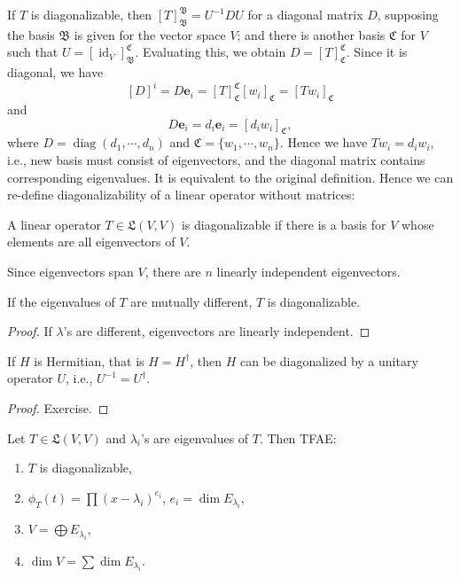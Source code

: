 If $T$ is diagonalizable, then $[T]_{\mathfrak B}^{\mathfrak B} = U^{-1}DU$ for a diagonal matrix $D$, supposing the basis $\mathfrak B$ is given for the vector space $V$; and there is another basis $\mathfrak C$ for $V$ such that $U = [\operatorname{id}_V]_{\mathfrak B}^{\mathfrak C}$. Evaluating this, we obtain $D=[T]_{\mathfrak C}^{\mathfrak C}.$ Since it is diagonal, we have $$[D]^{i} = D\mathbf e_i  = [T]_{\mathfrak C}^{\mathfrak C} [w_i]_{\mathfrak C}=[T w_i]_{\mathfrak C}$$ and $$D\mathbf e_i = d_i\mathbf e_i =[d_i w_i]_{\mathfrak C},$$ where $D=\operatorname{diag}(d_1,\cdots,d_n)$ and $\mathfrak C = \{w_1, \cdots, w_n\}.$ Hence we have $Tw_i = d_i w_i$, i.e., new basis must consist of eigenvectors, and the diagonal matrix contains corresponding eigenvalues. It is equivalent to the original definition. Hence we can re-define diagonalizability of a linear operator without matrices:
\begin{defn} A linear operator $T\in\mathfrak L(V,V)$ is diagonalizable if there is a basis for $V$ whose elements are all eigenvectors of $V$.
\end{defn}
Since eigenvectors span $V$, there are $n$ linearly independent eigenvectors.
\begin{prop}
If the eigenvalues of $T$ are mutually different, $T$ is diagonalizable.
\end{prop}
\begin{proof}
If $\lambda$'s are different, eigenvectors are linearly independent.
\end{proof}
\begin{prop}
If $H$ is Hermitian, that is $H=H^\dagger$, then $H$ can be diagonalized by a unitary operator $U$, i.e., $U^{-1} = U^\dagger.$
\end{prop}
\begin{proof}
Exercise.
\end{proof}
\begin{theorem}
Let $T\in \mathfrak L(V,V)$ and $\lambda_i$'s are eigenvalues of $T$. Then TFAE:
\begin{enumerate}[label={(\alph*)}]
    \item $T$ is diagonalizable,
    \item $\phi_T(t) = \prod (x-\lambda_i)^{e_i}$, $e_i = \dim E_{\lambda_i},$
    \item $V = \bigoplus E_{\lambda_i},$
    \item $\dim V = \sum \dim E_{\lambda_i}.$
\end{enumerate}
\end{theorem}
